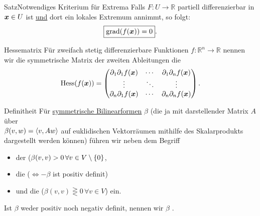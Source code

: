 \begin{Satz}
{Satz}{Notwendiges Kriterium für Extrema}
Falls $F:U\to\mathbb{R}$ partiell differenzierbar in ${{\text{\boldmath${x}$}}}\in U$ ist \underline{und} dort ein lokales Extremum annimmt, so folgt:
\begin{equation}
    \boxed{\text{grad} (f({{\text{\boldmath${x}$}}}))=0}.
\end{equation}
\end{Satz}
\begin{Def}
{Hessematrix}
Für zweifach stetig differenzierbare Funktionen $f:\mathbb{R}^n\to\mathbb{R}$ nennen wir die symmetrische Matrix der zweiten Ableitungen die 
\begin{equation}
    \text{Hess}( f({{\text{\boldmath${x}$}}}))=\begin{pmatrix}\partial_1\partial_1 f({{\text{\boldmath${x}$}}})&\cdots&\partial_1\partial_n f({{\text{\boldmath${x}$}}})\\
    \vdots&\ddots&\vdots\\\partial_n\partial_1 f({{\text{\boldmath${x}$}}})&\cdots&\partial_n\partial_nf({{\text{\boldmath${x}$}}})\end{pmatrix}.
\end{equation}
\end{Def}
\begin{Def}
{Definitheit}
Für \underline{symmetrische Bilinearformen} $\beta$ (die ja mit darstellender Matrix $A$ über\\
$\beta(v,w)=\left\langle v,Aw\right\rangle$ auf euklidischen Vektorräumen mithilfe des Skalarprodukts dargestellt werden können) führen wir neben dem Begriff
\begin{itemize}
    \item der  ($\beta(v,v)>0\,\forall v\in V\setminus\left\{0\right\}$,
    \item die  ($\iff-\beta$ ist positiv definit)
    \item und die  ($\beta(v,v)\gtreqless 0\,\forall v\in V$) ein.
\end{itemize}
Ist $\beta$ weder positiv noch negativ definit, nennen wir $\beta$ .
\end{Def}
